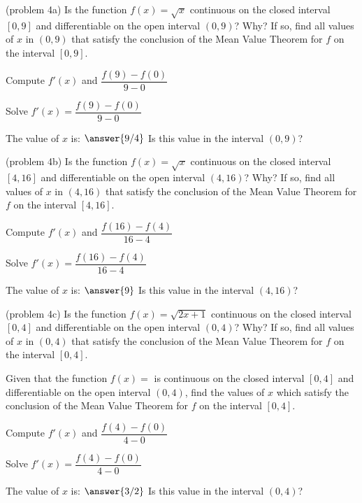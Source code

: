 \documentclass[handout]{ximera}
\begin{document}
\begin{problem}(problem 4a)
  Is the function $f(x) = \sqrt x$ continuous on the closed interval $[0,9]$ and differentiable on the open interval $(0,9)$? Why?
  If so, find all values of $x$ in $(0,9)$ that satisfy the conclusion of the Mean Value Theorem for $f$ on the interval $[0,9]$.
	
    \begin{hint}
      Compute $f'(x)$ and $\dfrac{f(9) - f(0)}{9-0}$
    \end{hint}
		\begin{hint}
		  Solve $f'(x) = \dfrac{f(9) - f(0)}{9-0}$
		\end{hint}
		
		The value of $x$ is:
		 $\answer{9/4}$
     Is this value in the interval $(0,9)$?
\end{problem}


\begin{problem}(problem 4b)
  Is the function $f(x) = \sqrt x$ continuous on the closed interval $[4,16]$ and differentiable on the open interval $(4,16)$? Why?
  If so, find all values of $x$ in $(4,16)$ that satisfy the conclusion of the Mean Value Theorem for $f$ on the interval $[4,16]$.
	
    \begin{hint}
      Compute $f'(x)$ and $\dfrac{f(16) - f(4)}{16-4}$
    \end{hint}
		\begin{hint}
		  Solve $f'(x) = \dfrac{f(16) - f(4)}{16-4}$
		\end{hint}
		
		The value of $x$ is:
		 $\answer{9}$
     Is this value in the interval $(4,16)$?
\end{problem}


\begin{problem}(problem 4c)
  Is the function $f(x) = \sqrt{2x+1}$ continuous on the closed interval $[0,4]$ and differentiable on the open interval $(0,4)$? Why?
  If so, find all values of $x$ in $(0,4)$ that satisfy the conclusion of the Mean Value Theorem for $f$ on the interval $[0,4]$.


  Given that the function $f(x) = $ is continuous on the closed interval $[0,4]$ and differentiable on the open interval $(0,4)$,
  find the values of $x$ which satisfy the conclusion of the Mean Value Theorem for $f$ on the interval $[0,4]$.
	
    \begin{hint}
      Compute $f'(x)$ and $\dfrac{f(4) - f(0)}{4-0}$
    \end{hint}
		\begin{hint}
		  Solve $f'(x) = \dfrac{f(4) - f(0)}{4-0}$
		\end{hint}
		
		The value of $x$ is:
		 $\answer{3/2}$
     Is this value in the interval $(0,4)$?
\end{problem}
\end{document}
